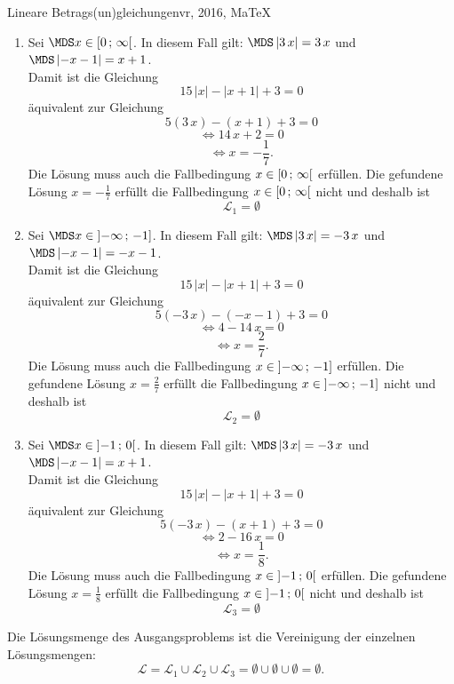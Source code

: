 \begin{MAufgabe}{Lineare Betrags(un)gleichungen}{vr, 2016, MaTeX}
 \begin{enumerate} 
 \item Sei $ \MDS x\in[ 0 \, \MIntvlSep \, \infty\MoIr $. 
 In diesem Fall gilt: 
  $ \MDS \left| 3\, x\right|=3\, x$ und $ \MDS \left|  - x - 1\right|=x + 1$. \\ 
 Damit ist die Gleichung 
 $$ 
15\, \left|x\right| - \left|x + 1\right| + 3= 0
$$
 \"aquivalent zur Gleichung
 $$ 
5\left(3\, x\right)-\left( x + 1\right)+3= 0 
$$  
$$ 
 \Leftrightarrow 14\, x + 2= 0 
$$  
$$ \Leftrightarrow x = - \frac{1}{7} . 
 $$ 
 Die L\"osung muss auch die Fallbedingung $x\in [ 0 \, ; \, \infty[\mbox{}  $ erf\"ullen. Die gefundene L\"osung $x=- \frac{1}{7}$ erf\"ullt die Fallbedingung  $x\in [ 0 \, ; \, \infty[\mbox{} $ nicht und deshalb ist  $$
 \mathcal{L}_{1}=\emptyset 
 $$ 
\item Sei $ \MDS x\in\MoIl  -\infty \, \MIntvlSep \, -1]$. 
 In diesem Fall gilt: 
  $ \MDS \left| 3\, x\right|=- 3\, x$ und $ \MDS \left|  - x - 1\right|= - x - 1$. \\ 
 Damit ist die Gleichung 
 $$ 
15\, \left|x\right| - \left|x + 1\right| + 3= 0
$$
 \"aquivalent zur Gleichung
 $$ 
5\left(- 3\, x\right)-\left(  - x - 1\right)+3= 0 
$$  
$$ 
 \Leftrightarrow 4 - 14\, x= 0 
$$  
$$ \Leftrightarrow x = \frac{2}{7} . 
 $$ 
 Die L\"osung muss auch die Fallbedingung $x\in \mbox{}]\mathopen{}  -\infty \, ; \, -1] $ erf\"ullen. Die gefundene L\"osung $x=\frac{2}{7}$ erf\"ullt die Fallbedingung  $x\in \mbox{}]\mathopen{}  -\infty \, ; \, -1]$ nicht und deshalb ist  $$
 \mathcal{L}_{2}=\emptyset 
 $$ 
\item Sei $ \MDS x\in\MoIl  -1 \, \MIntvlSep \, 0\MoIr $. 
 In diesem Fall gilt: 
  $ \MDS \left| 3\, x\right|=- 3\, x$ und $ \MDS \left|  - x - 1\right|=x + 1$. \\ 
 Damit ist die Gleichung 
 $$ 
15\, \left|x\right| - \left|x + 1\right| + 3= 0
$$
 \"aquivalent zur Gleichung
 $$ 
5\left(- 3\, x\right)-\left( x + 1\right)+3= 0 
$$  
$$ 
 \Leftrightarrow 2 - 16\, x= 0 
$$  
$$ \Leftrightarrow x = \frac{1}{8} . 
 $$ 
 Die L\"osung muss auch die Fallbedingung $x\in \mbox{}]\mathopen{}  -1 \, ; \, 0[\mbox{}  $ erf\"ullen. Die gefundene L\"osung $x=\frac{1}{8}$ erf\"ullt die Fallbedingung  $x\in \mbox{}]\mathopen{}  -1 \, ; \, 0[\mbox{} $ nicht und deshalb ist  $$
 \mathcal{L}_{3}=\emptyset 
 $$ 
 \end{enumerate} 
  Die L\"osungsmenge des Ausgangsproblems ist die Vereinigung der einzelnen L\"osungsmengen: 
$$ \mathcal{L} = \mathcal{L}_{1} \cup \mathcal{L}_{2} \cup \mathcal{L}_{3} 
 = \emptyset\cup \emptyset\cup \emptyset 
   =\emptyset 
   . $$ 
 

\end{MAufgabe}
